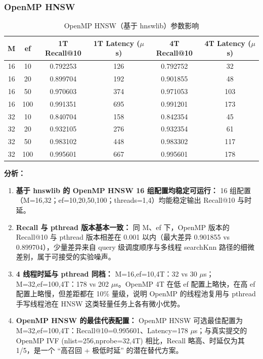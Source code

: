 \documentclass[a4paper]{article}
\begin{document}
\subsubsection{OpenMP HNSW}

\begin{table}[htbp]
\centering
\caption{OpenMP HNSW（基于 hnswlib）参数影响}
\begin{tabular}{cccccc}
\toprule
M & ef & 1T Recall@10 & 1T Latency ($\mu$s) & 4T Recall@10 & 4T Latency ($\mu$s) \\
\midrule
16 & 10  & 0.792253 & 126  & 0.792752 & 32  \\
16 & 20  & 0.899704 & 192  & 0.901855 & 48  \\
16 & 50  & 0.970603 & 374  & 0.971053 & 103 \\
16 & 100 & 0.991351 & 695  & 0.991201 & 173 \\
32 & 10  & 0.840704 & 158  & 0.842354 & 45  \\
32 & 20  & 0.932105 & 276  & 0.932354 & 61  \\
32 & 50  & 0.983102 & 448  & 0.983302 & 117 \\
32 & 100 & 0.995601 & 667  & 0.995601 & 178 \\
\bottomrule
\end{tabular}
\end{table}

\textbf{分析：}
\begin{enumerate}
\item \textbf{基于 hnswlib 的 OpenMP HNSW 16 组配置均稳定可运行：} 16 组配置（M=16,32；ef=10,20,50,100；threads=1,4）均能稳定输出 Recall@10 与时延。
\item \textbf{Recall 与 pthread 版本基本一致：} 同 M、ef 下，OpenMP 版本的 Recall@10 与 pthread 版本相差在 0.001 以内（最大差异 0.901855 vs 0.899704），少量差异来自 query 级调度顺序与多线程 searchKnn 路径的细微差别，属于可接受的实验噪声。
\item \textbf{4 线程时延与 pthread 同档：} M=16,ef=10,4T：32 vs 30 $\mu$s；M=32,ef=100,4T：178 vs 202 $\mu$s。OpenMP 4T 在低 ef 配置上略快，在高 ef 配置上略慢，但差距都在 10\% 量级，说明 OpenMP 的线程池复用与 pthread 手写线程池在 HNSW 这类轻量任务上各有微小优势。
\item \textbf{OpenMP HNSW 的最佳代表配置：} OpenMP HNSW 可选最佳配置为 M=32,ef=100,4T：Recall@10=0.995601、Latency=178 $\mu$s；与真实提交的 OpenMP IVF (nlist=256,nprobe=32,4T) 相比，Recall 略高、时延仅为其 1/5，是一个 ``高召回 + 极低时延'' 的潜在替代方案。
\end{enumerate}
\end{document}
